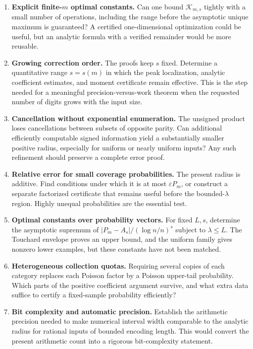 \documentclass[11pt,a4paper]{article}
\theoremstyle{definition}
\newcommand{\Kopt}{\mathcal K}
\begin{document}
\begin{enumerate}[label=\textbf{Q\arabic*.},leftmargin=2.7em]
\item \textbf{Explicit finite-$m$ optimal constants.}
Can one bound $\Kopt_{m,s}$ tightly with a small number of operations,
including the range before the asymptotic unique maximum is guaranteed?
A certified one-dimensional optimization could be useful, but an analytic
formula with a verified remainder would be more reusable.

\item \textbf{Growing correction order.}
The proofs keep $s$ fixed. Determine a quantitative range $s=s(m)$ in
which the peak localization, analytic coefficient estimates, and moment
certificate remain effective. This is the step needed for a meaningful
precision-versus-work theorem when the requested number of digits grows
with the input size.

\item \textbf{Cancellation without exponential enumeration.}
The unsigned product loses cancellations between subsets of opposite
parity. Can additional efficiently computable signed information yield
a substantially smaller positive radius, especially for uniform or
nearly uniform inputs? Any such refinement should preserve a complete
error proof.

\item \textbf{Relative error for small coverage probabilities.}
The present radius is additive. Find conditions under which it is at
most $\varepsilon P_m$, or construct a separate factorized certificate
that remains useful before the bounded-$\lambda$ region. Highly unequal
probabilities are the essential test.

\item \textbf{Optimal constants over probability vectors.}
For fixed $L,s$, determine the asymptotic supremum of
$|P_m-A_s|/(\log n/n)^s$ subject to $\lambda\le L$. The Touchard envelope
proves an upper bound, and the uniform family gives nonzero lower
examples, but these constants have not been matched.

\item \textbf{Heterogeneous collection quotas.}
Requiring several copies of each category replaces each Poisson factor
by a Poisson upper-tail probability. Which parts of the positive
coefficient argument survive, and what extra data suffice to certify a
fixed-sample probability efficiently?

\item \textbf{Bit complexity and automatic precision.}
Establish the arithmetic precision needed to make numerical interval
width comparable to the analytic radius for rational inputs of bounded
encoding length. This would convert the present arithmetic count into
a rigorous bit-complexity statement.


\end{enumerate}
\end{document}
